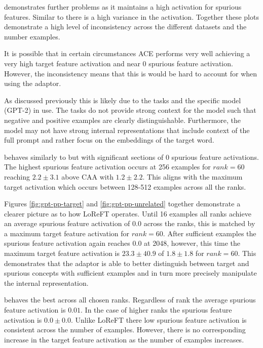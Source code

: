  demonstrates further problems as it maintains a high activation for spurious features.
Similar to  there is a high variance in the activation.
Together these plots demonstrate a high level of inconsistency across the different datasets and the number examples.

It is possible that in certain circumstances ACE performs very well achieving a very high target feature activation and near 0 spurious feature activation.
However, the inconsistency means that this is would be hard to account for when using the adaptor.

As discussed previously this is likely due to the tasks and the specific model (GPT-2) in use.
The tasks do not provide strong context for the model such that negative and positive examples are clearly distinguishable.
Furthermore, the model may not have strong internal representations that include context of the full prompt and rather focus on the embeddings of the target word.

 behaves similarly to  but with significant sections of 0 spurious feature activations.
The highest spurious feature activation occurs at 256 examples for $rank = 60$ reaching $2.2 \pm 3.1$ above CAA with $1.2 \pm 2.2$.
This aligns with the maximum target activation which occurs between 128-512 examples across all the ranks.

Figures \ref{fig:gpt-pp-target} and \ref{fig:gpt-pp-unrelated} together demonstrate a clearer picture as to how LoReFT operates.
Until 16 examples all ranks achieve an average spurious feature activation of $0.0$ across the ranks, this is matched by a maximum target feature activation for $rank = 60$.
After sufficient examples the spurious feature activation again reaches $0.0$ at 2048, however, this time the maximum target feature activation is $23.3 \pm 40.9$ of $1.8 \pm 1.8$ for $rank = 60$.
This demonstrates that the adaptor is able to better distinguish between target and spurious concepts with sufficient examples and in turn more precisely manipulate the internal representation.

 behaves the best across all chosen ranks.
Regardless of rank the average spurious feature activation is $0.01$.
In the case of higher ranks the spurious feature activation is $0.0 \pm 0.0$.
Unlike LoReFT there low spurious feature activation is consistent across the number of examples.
However, there is no corresponding increase in the target feature activation as the number of examples increases.

